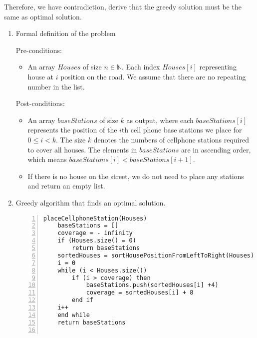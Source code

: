 \documentclass{cpsc413Solutions}
\begin{document}
\begin{problemlist}
\begin{problem}
\begin{answer}
Therefore, we have contradiction, derive that the greedy solution must be the same as optimal solution.


\end{answer}
\end{problem}


\begin{problem}
\begin{answer}
\begin{enumerate}
    \item Formal definition of the problem
    
    Pre-conditions:
    \begin{itemize}
        \item An array $Houses$ of size $n \in \mathbb{N}$. Each index $Houses[i]$ representing house at $i$ position on the road. We assume that there are no repeating number in the list.
    \end{itemize}   

    Post-conditions:
    \begin{itemize}
        \item An array $baseStations$ of size $k$ as output, where each $baseStations[i]$ represents the position of the $i$th cell phone base stations we place for $ 0\leq i < k$. The size $k$ denotes the numbers of cellphone stations required to cover all houses. The elements in $baseStations$ are in ascending order, which means $baseStations[i] < baseStations[i+1]$.
        \item If there is no house on the street, we do not need to place any stations and return an empty list.
    \end{itemize}
    
    \item Greedy algorithm that finds an optimal solution.
    
\begin{lstlisting}[numbers=left]
placeCellphoneStation(Houses)
    baseStations = []
    coverage = - infinity
    if (Houses.size() = 0) 
        return baseStations
    sortedHouses = sortHousePositionFromLeftToRight(Houses)
    i = 0
    while (i < Houses.size()) 
        if (i > coverage) then 
            baseStations.push(sortedHouses[i] +4)
            coverage = sortedHouses[i] + 8
        end if
    i++
    end while
    return baseStations
    
\end{lstlisting}


\end{enumerate}
\end{answer}
\end{problem}
\end{problemlist}
\end{document}
